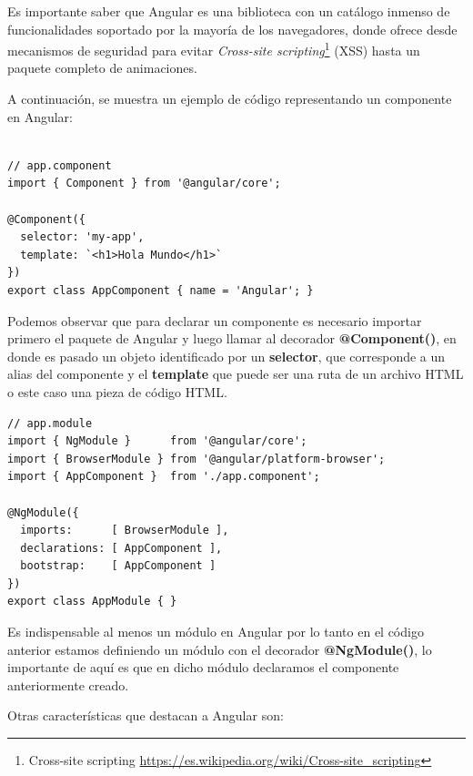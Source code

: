 Es importante saber que Angular es una biblioteca con un catálogo inmenso de funcionalidades soportado por la mayoría de los navegadores, donde ofrece desde mecanismos de seguridad para evitar \textit{Cross-site scripting}\footnote{Cross-site scripting \url{https://es.wikipedia.org/wiki/Cross-site_scripting}} (XSS) hasta un paquete completo de animaciones.

A continuación, se muestra un ejemplo de código representando un componente en Angular:
\begin{verbatim}

// app.component
import { Component } from '@angular/core';

@Component({
  selector: 'my-app',
  template: `<h1>Hola Mundo</h1>`
})
export class AppComponent { name = 'Angular'; }
\end{verbatim}

Podemos observar que para declarar un componente es necesario importar primero el paquete de Angular y luego llamar al decorador \textbf{@Component({})}, en donde es pasado un objeto identificado por un \textbf{selector}, que corresponde a un alias del componente y el \textbf{template} que puede ser una ruta de un archivo HTML o este caso una pieza de código HTML.

\begin{verbatim}
// app.module
import { NgModule }      from '@angular/core';
import { BrowserModule } from '@angular/platform-browser';
import { AppComponent }  from './app.component';

@NgModule({
  imports:      [ BrowserModule ],
  declarations: [ AppComponent ],
  bootstrap:    [ AppComponent ]
})
export class AppModule { }
\end{verbatim}

Es indispensable al menos un módulo en Angular por lo tanto en el código anterior estamos definiendo un módulo con el decorador \textbf{@NgModule({})}, lo importante de aquí es que en dicho módulo declaramos el componente anteriormente creado.

Otras características que destacan a Angular son:

